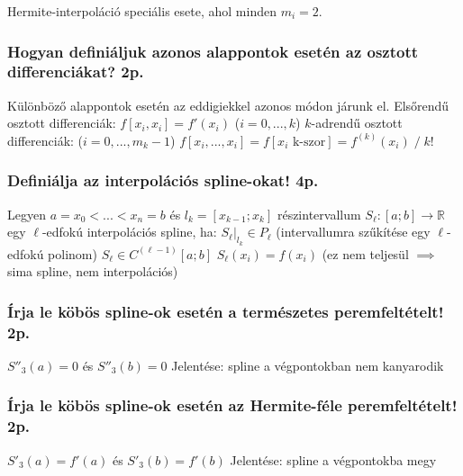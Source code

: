 \documentclass[12pt,a4paper]{article}
\begin{document}
Hermite-interpoláció speciális esete, ahol minden $m_i=2$. 

\subsubsection{Hogyan definiáljuk azonos alappontok esetén az osztott differenciákat? 2p.}

\begin{outline}
	\1 Különböző alappontok esetén az eddigiekkel azonos módon járunk el.
	\1 Elsőrendű osztott differenciák: $f[x_i,x_i] = f'(x_i)$ \;\; ($i=0,...,k$)
	\1 $k$-adrendű osztott differenciák: ($i=0,...,m_k-1$)
		\2 $f[x_i,...,x_i] = f[x_i \text{ k-szor}] = f^{(k)}(x_i) \;/\; k!$
\end{outline}

\pagebreak

\subsubsection{Definiálja az interpolációs spline-okat! 4p.}

\begin{outline}
	\1 Legyen $a = x_0 < ... < x_n = b$ és $l_k = [x_{k-1};x_k]$ részintervallum
	\1 $S_\ell : [a;b] \to \mathbb{R}$ egy $\ell$-edfokú interpolációs spline, ha:
		\2 $S_\ell |_{l_k} \in P_\ell$ \;\; (intervallumra szűkítése egy $\ell$-edfokú polinom)
		\2 $S_\ell \in C^{(\ell-1)}[a;b]$
		\2 $S_\ell(x_i) = f(x_i)$ \;\; (ez nem teljesül $\implies$ sima spline, nem interpolációs)
\end{outline}

\subsubsection{Írja le köbös spline-ok esetén a természetes peremfeltételt! 2p.}

\begin{outline}
	\1 $S''_3(a) = 0$ és $S''_3(b) = 0$
	\1 Jelentése: spline a végpontokban nem kanyarodik
\end{outline}

\subsubsection{Írja le köbös spline-ok esetén az Hermite-féle peremfeltételt! 2p.}

\begin{outline}
	\1 $S'_3(a) = f'(a)$ és $S'_3(b) = f'(b)$
	\1 Jelentése: spline a végpontokba megy
\end{outline}
\end{document}
